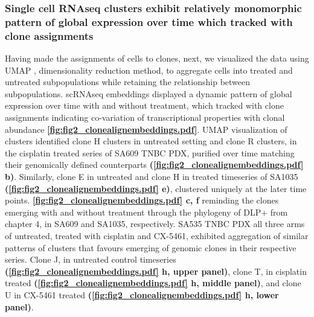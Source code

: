   
\subsubsection{Single cell RNAseq clusters exhibit relatively monomorphic pattern of global expression over time which tracked with clone assignments}
Having made the assignments of cells to clones, next, we visualized the data using UMAP \cite{becht2019dimensionality}, dimensionality reduction method, to aggregate cells into treated and untreated subpopulations while retaining the relationship between subpopulations. scRNAseq embeddings displayed a dynamic pattern of global expression over time with and without treatment, which tracked with clone assignments indicating co-variation of transcriptional properties with clonal abundance \textbf{\autoref{fig:fig2_clonealignembeddings.pdf}}. UMAP visualization of clusters identified clone H clusters in untreated setting and clone R clusters, in the cisplatin treated series of SA609 TNBC PDX, purified over time matching their genomically defined counterparts \textbf{(\autoref{fig:fig2_clonealignembeddings.pdf} b)}. Similarly, clone E in untreated and clone H in treated timeseries of SA1035  \textbf{(\autoref{fig:fig2_clonealignembeddings.pdf} e)}, clustered uniquely at the later time points. \textbf{\autoref{fig:fig2_clonealignembeddings.pdf} c, f} reminding the clones emerging with and without treatment through the phylogeny of DLP+ from chapter 4, in SA609 and SA1035, respectively.  SA535 TNBC PDX all three arms of untreated, treated with cisplatin and CX-5461, exhibited aggregation of similar patterns of clusters that favours emerging of genomic clones in their respective series. Clone J, in untreated control timeseries \textbf{(\autoref{fig:fig2_clonealignembeddings.pdf} h, upper panel)}, clone T, in cisplatin treated \textbf{(\autoref{fig:fig2_clonealignembeddings.pdf} h, middle panel)}, and clone U in CX-5461 treated \textbf{(\autoref{fig:fig2_clonealignembeddings.pdf} h, lower panel)}.


